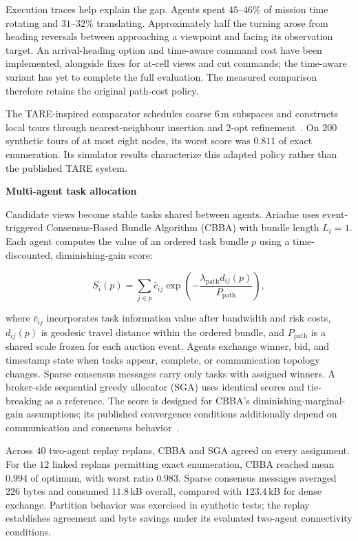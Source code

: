 \documentclass[10pt,a4paper]{article}
\newcommand{\indentedheading}[1]{\par\addvspace{0.65em}\noindent\hspace*{1em}\textbf{#1}\par\smallskip}
\begin{document}
Execution traces help explain the gap. Agents spent $45$--$46\%$
of mission time rotating and $31$--$32\%$ translating. Approximately
half the turning arose from heading reversals between approaching a
viewpoint and facing its observation target. An arrival-heading option
and time-aware command cost have been implemented, alongside fixes for
at-cell views and cut commands; the time-aware variant has yet to
complete the full evaluation. The measured comparison therefore
retains the original path-cost policy.

The TARE-inspired comparator schedules coarse $6$\,m subspaces and
constructs local tours through nearest-neighbour insertion and 2-opt
refinement~\cite{tare2021}. On $200$ synthetic tours of at most eight
nodes, its worst score was $0.811$ of exact enumeration. Its simulator
results characterize this adapted policy rather than the published
TARE system.

\indentedheading{Multi-agent task allocation}

Candidate views become stable tasks shared between agents. Ariadne
uses event-triggered Consensus-Based Bundle Algorithm (CBBA) with
bundle length $L_t=1$. Each agent computes the value of an ordered
task bundle $p$ using a time-discounted, diminishing-gain score:

\begin{equation}
    S_i(p)=
    \sum_{j\in p}
    \bar c_{ij}
    \exp\!\left(
        -\frac{\lambda_{\mathrm{path}}
               d_{ij}(p)}
              {P_{\mathrm{path}}}
    \right),
    \label{eq:cbba-score}
\end{equation}

where $\bar c_{ij}$ incorporates task information value after bandwidth
and risk costs, $d_{ij}(p)$ is geodesic travel distance within the
ordered bundle, and $P_{\mathrm{path}}$ is a shared scale frozen for
each auction event. Agents exchange winner, bid, and timestamp state
when tasks appear, complete, or communication topology changes.
Sparse consensus messages carry only tasks with assigned winners.
A broker-side sequential greedy allocator (SGA) uses identical scores
and tie-breaking as a reference. The score is designed for CBBA's
diminishing-marginal-gain assumptions; its published convergence
conditions additionally depend on communication and consensus
behavior~\cite{cbba}.

Across $40$ two-agent replay replans, CBBA and SGA agreed on every
assignment. For the $12$ linked replans permitting exact enumeration,
CBBA reached mean \textbf{$0.994$} of optimum, with worst ratio
$0.983$. Sparse consensus messages averaged $226$ bytes and consumed
$11.8$\,kB overall, compared with $123.4$\,kB for dense exchange.
Partition behavior was exercised in synthetic tests; the replay
establishes agreement and byte savings under its evaluated two-agent
connectivity conditions.
\end{document}
